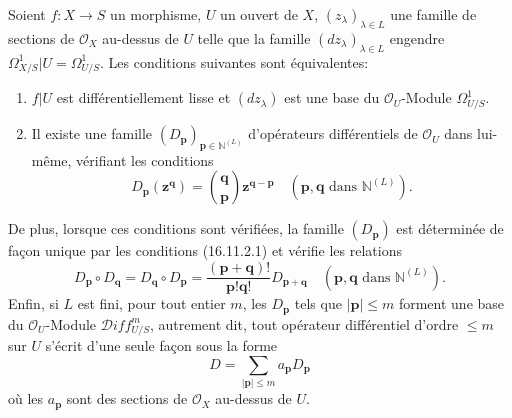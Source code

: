 \begin{theorem}[16.11.2]
\label{IV.16.11.2}
Soient $f:X\to S$ un morphisme, $U$ un ouvert de $X$,
$(z_\lambda)_{\lambda\in L}$ une famille de sections de $\mathcal{O}_X$
au-dessus de $U$ telle que la famille $(dz_\lambda)_{\lambda\in L}$ engendre
$\varOmega_{X/S}^1|U=\varOmega_{U/S}^1$. Les conditions suivantes sont
équivalentes:
\begin{enumerate}
  \item[\textup{a)}] $f|U$ est différentiellement lisse et $(dz_\lambda)$ est une base
  du $\mathcal{O}_U$-Module $\varOmega_{U/S}^1$.
  \item[\textup{b)}] Il existe une famille
  $(D_{\mathbf{p}})_{\mathbf{p}\in\mathbb{N}^{(L)}}$ d'opérateurs
  différentiels de $\mathcal{O}_U$ dans lui-même, vérifiant les conditions
  \[
    D_{\mathbf{p}}(\mathbf{z}^{\mathbf{q}})
    =\binom{\mathbf{q}}{\mathbf{p}}
      \mathbf{z}^{\mathbf{q}-\mathbf{p}}
    \quad(\mathbf{p},\mathbf{q}\text{ dans }\mathbb{N}^{(L)}).
    \tag{16.11.2.1}
    \label{IV.16.11.2.1}
  \]
\end{enumerate}

De plus, lorsque ces conditions sont vérifiées, la famille
$(D_{\mathbf{p}})$ est déterminée de façon unique par les conditions
\textup{(16.11.2.1)} et vérifie les relations
\[
  D_{\mathbf{p}}\circ D_{\mathbf{q}}
  =D_{\mathbf{q}}\circ D_{\mathbf{p}}
  =\frac{(\mathbf{p}+\mathbf{q})!}{\mathbf{p}!\mathbf{q}!}
    D_{\mathbf{p}+\mathbf{q}}
  \quad(\mathbf{p},\mathbf{q}\text{ dans }\mathbb{N}^{(L)}).
  \tag{16.11.2.2}
  \label{IV.16.11.2.2}
\]
Enfin, si $L$ est fini, pour tout entier $m$, les $D_{\mathbf{p}}$ tels que
$|\mathbf{p}|\leq m$ forment une base du $\mathcal{O}_U$-Module
$\mathscr{D}\!iff_{U/S}^m$, autrement dit, tout opérateur différentiel
d'ordre $\leq m$ sur $U$ s'écrit d'une seule façon sous la forme
\[
  D=\sum_{|\mathbf{p}|\leq m}a_{\mathbf{p}}D_{\mathbf{p}}
\]
où les $a_{\mathbf{p}}$ sont des sections de $\mathcal{O}_X$ au-dessus de
$U$.
\end{theorem}

